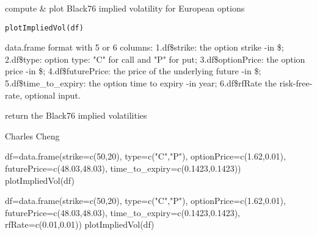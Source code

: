 \documentclass[a4paper]{book}
\begin{document}
%
\begin{Description}\relax
compute \& plot Black76 implied volatility for European options
\end{Description}
%
\begin{Usage}
\begin{verbatim}
plotImpliedVol(df)
\end{verbatim}
\end{Usage}
%
\begin{Arguments}
\begin{ldescription}
\item[\code{df}] data.frame format with 5 or 6 columns: 
1.df\$strike: the option strike -in \$;  
2.df\$type: option type: "C" for call and "P" for put;  
3.df\$optionPrice: the option price -in \$; 
4.df\$futurePrice: the price of the underlying future -in \$;  
5.df\$time\_to\_expiry: the option time to expiry -in year;  
6.df\$rfRate the risk-free-rate, optional input.

\end{ldescription}
\end{Arguments}
%
\begin{Value}
return the Black76 implied volatilities
\end{Value}
%
\begin{Author}\relax
Charles Cheng
\end{Author}
%
\begin{Examples}
\begin{ExampleCode}
df=data.frame(strike=c(50,20), type=c("C","P"), optionPrice=c(1.62,0.01), futurePrice=c(48.03,48.03), time_to_expiry=c(0.1423,0.1423))
plotImpliedVol(df)

df=data.frame(strike=c(50,20), type=c("C","P"), optionPrice=c(1.62,0.01), futurePrice=c(48.03,48.03), time_to_expiry=c(0.1423,0.1423), rfRate=c(0.01,0.01))
plotImpliedVol(df)
\end{ExampleCode}
\end{Examples}
\printindex{}
\end{document}
